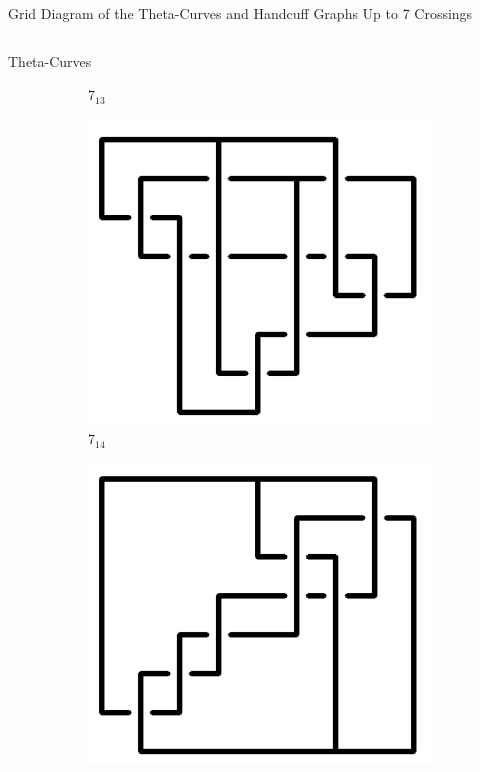 \documentclass[final]{beamer}
\begin{document}
\begin{frame}[t]
\begin{alertblock}{Grid Diagram of the Theta-Curves and Handcuff Graphs Up to 7 Crossings}
\begin{columns}[t]
\begin{column}{0.5\textwidth}
\begin{alertblock}{Theta-Curves}
\begin{figure}
\begin{subfigure}{0.075\textwidth}
    \caption{$7_{13}$} 
    \end{subfigure}
    \begin{subfigure}{0.075\textwidth}
    \includegraphics[width=\columnwidth]{../Midterm_Poster/grid_diagram/theta_7_14.png}
    \caption{$7_{14}$} 
    \end{subfigure}
    \begin{subfigure}{0.075\textwidth}
    \includegraphics[width=\columnwidth]{../Midterm_Poster/grid_diagram/theta_7_15.png}

\end{subfigure}
\end{figure}
\end{alertblock}
\end{column}
\end{columns}
\end{alertblock}
\end{frame}
\end{document}
